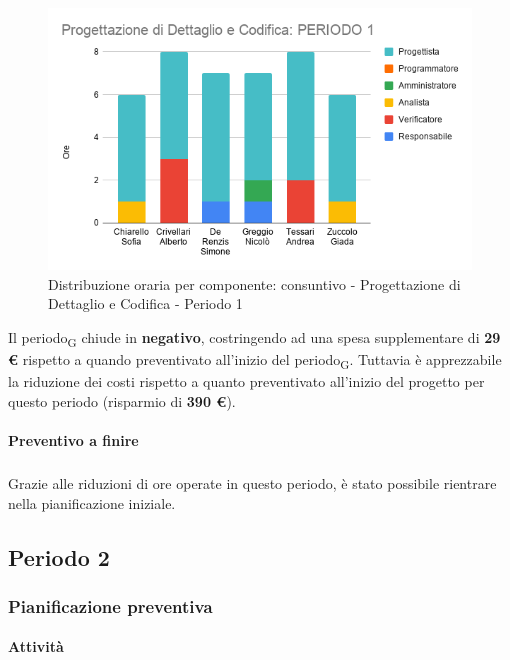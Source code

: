 \begin{figure}[H]
	\centering
	\includegraphics[scale=0.6]{res/images/charts/consuntivo/prog_dett_1.png}
	\caption{Distribuzione oraria per componente: consuntivo - Progettazione di Dettaglio e Codifica - Periodo 1}
\end{figure}


Il periodo\textsubscript{G} chiude in \textbf{negativo}, costringendo ad una spesa supplementare di \textbf{29 \euro} rispetto a quando preventivato all'inizio del periodo\textsubscript{G}. Tuttavia è apprezzabile la riduzione dei costi rispetto a quanto preventivato all'inizio del progetto per questo periodo (risparmio di \textbf{390 \euro}).


\paragraph{Preventivo a finire}
\subparagraph*{}

\pafTable{
	
}

Grazie alle riduzioni di ore operate in questo periodo, è stato possibile rientrare nella pianificazione iniziale.


\pagebreak
\subsection{Periodo 2}

\subsubsection{Pianificazione preventiva}

\paragraph{Attività}
\subparagraph*{}


